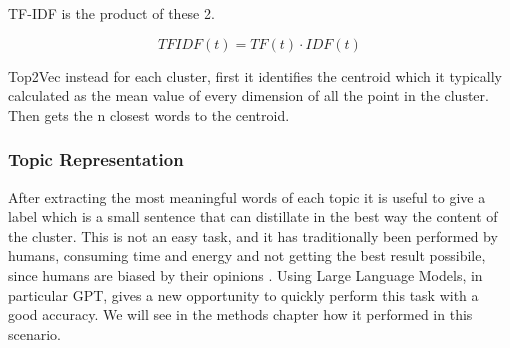 TF-IDF is the product of these 2.

\begin{equation}
    TFIDF(t) = TF(t) \cdot IDF(t)
\end{equation}



Top2Vec instead for each cluster, first it identifies the centroid which it typically calculated as the mean value of every dimension of all the point in the cluster. Then gets the n closest words to the centroid.


\subsubsection{Topic Representation}
After extracting the most meaningful words of each topic it is useful to give a label which is a small sentence that can distillate in the best way the content of the cluster.  This is not an easy task, and it has traditionally been performed by humans,  consuming time and energy and not getting the best result possibile, since humans are biased by their opinions  \cite{misra_seeing_2016} \cite{haliburton_investigating_2023}.  Using Large Language Models, in particular GPT, gives a new opportunity to quickly perform this task with a good accuracy. We will see in the methods chapter how it performed in this scenario.


        